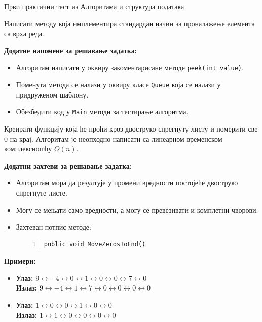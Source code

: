 
Први практични тест из Алгоритама и структура података

Написати методу која имплементира стандардан начин за проналажење елемента са врха реда.

\textbf{Додатне напомене за решавање задатка:}
\begin{itemize}
    \item Алгоритам написати у оквиру закоментарисане методе \texttt{peek(int value)}.
    \item Поменута метода се налази у оквиру класе \texttt{Queue} која се налази у придруженом шаблону.
    \item Обезбедити код у \texttt{Main} методи за тестирање алгоритма.
\end{itemize}



Креирати функцију која ће проћи кроз двоструко спрегнуту листу и померити све 0 на крај. Алгоритам је неопходно написати са линеарном временском комплексношћу $O(n)$.

\textbf{Додатни захтеви за решавање задатка:}
\begin{itemize}
    \item Алгоритам мора да резултује у промени вредности постојеће двоструко спрегнуте листе.
    \item Могу се мењати само вредности, а могу се превезивати и комплетни чворови.
    \item Захтеван потпис методе:
    \begin{Verbatim}[fontsize=\footnotesize, numbers=left, xleftmargin=10mm]
public void MoveZerosToEnd()
    \end{Verbatim}
\end{itemize}

\textbf{Примери:}
\begin{itemize}
    \item \textbf{Улаз:} $9 \leftrightarrow -4 \leftrightarrow 0 \leftrightarrow 1 \leftrightarrow 0 \leftrightarrow 0 \leftrightarrow 7 \leftrightarrow 0$ \\
          \textbf{Излаз:} $9 \leftrightarrow -4 \leftrightarrow 1 \leftrightarrow 7 \leftrightarrow 0 \leftrightarrow 0 \leftrightarrow 0 \leftrightarrow 0$
    \item \textbf{Улаз:} $1 \leftrightarrow 0 \leftrightarrow 0 \leftrightarrow 1 \leftrightarrow 0 \leftrightarrow 0$ \\
          \textbf{Излаз:} $1 \leftrightarrow 1 \leftrightarrow 0 \leftrightarrow 0 \leftrightarrow 0 \leftrightarrow 0$
\end{itemize}



